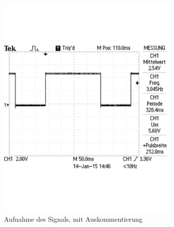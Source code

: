 \documentclass[12pt,a4paper]{article}
\begin{document}
\begin{figure}[H]
\centering
\begin{subfigure}[b]{0.45\textwidth} 	
  \includegraphics[trim = 0mm 50mm 0mm 50mm, clip, scale = 0.4]{TEK0002.pdf}
  \caption[Aufnahme des Signals, mit Auskommentierung]{Aufnahme des Signals, mit Auskommentierung} 
  \label{fig:g_3}
\end{subfigure}
\hfill
\begin{subfigure}[b]{0.45\textwidth}	

\end{subfigure}
\end{figure}
\end{document}
